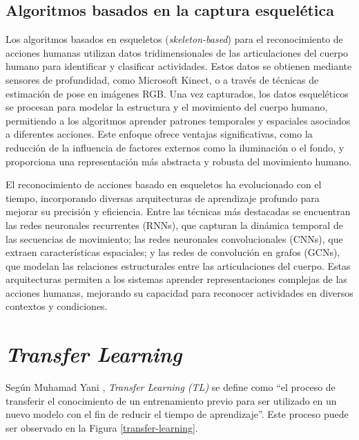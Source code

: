 \subsection{Algoritmos basados en la captura esquelética}

Los algoritmos basados en esqueletos (\textit{skeleton-based}) 
para el reconocimiento de acciones humanas utilizan datos 
tridimensionales de las articulaciones del cuerpo humano 
para identificar y clasificar actividades\cite{LoPresti2016}. Estos datos se 
obtienen mediante sensores de profundidad, como Microsoft 
Kinect, o a través de técnicas de estimación de pose en 
imágenes RGB. Una vez capturados, los datos esqueléticos se 
procesan para modelar la estructura y el movimiento del 
cuerpo humano, permitiendo a los algoritmos aprender patrones 
temporales y espaciales asociados a diferentes acciones. 
Este enfoque ofrece ventajas significativas, como la 
reducción de la influencia de factores externos como la 
iluminación o el fondo, y proporciona una representación más 
abstracta y robusta del movimiento humano.

El reconocimiento de acciones basado en esqueletos ha 
evolucionado con el tiempo, incorporando diversas arquitecturas 
de aprendizaje profundo para mejorar su precisión y 
eficiencia\cite{Ren2024}. Entre las técnicas más destacadas se encuentran 
las redes neuronales recurrentes (RNNs), que capturan la 
dinámica temporal de las secuencias de movimiento; las 
redes neuronales convolucionales (CNNs), que extraen 
características espaciales; y las redes de convolución en 
grafos (GCNs), que modelan las relaciones estructurales entre 
las articulaciones del cuerpo. Estas arquitecturas permiten 
a los sistemas aprender representaciones complejas de las 
acciones humanas, mejorando su capacidad para reconocer 
actividades en diversos contextos y condiciones.

\section{\textit{Transfer Learning}}
Según Muhamad Yani \cite{Yani2019}, 
\textit{Transfer Learning (TL)} se define como ``el proceso de 
transferir el conocimiento de un entrenamiento previo para ser 
utilizado en un nuevo modelo con el fin de reducir el tiempo de 
aprendizaje''. Este proceso puede ser observado en la Figura 
\ref{transfer-learning}.\\

